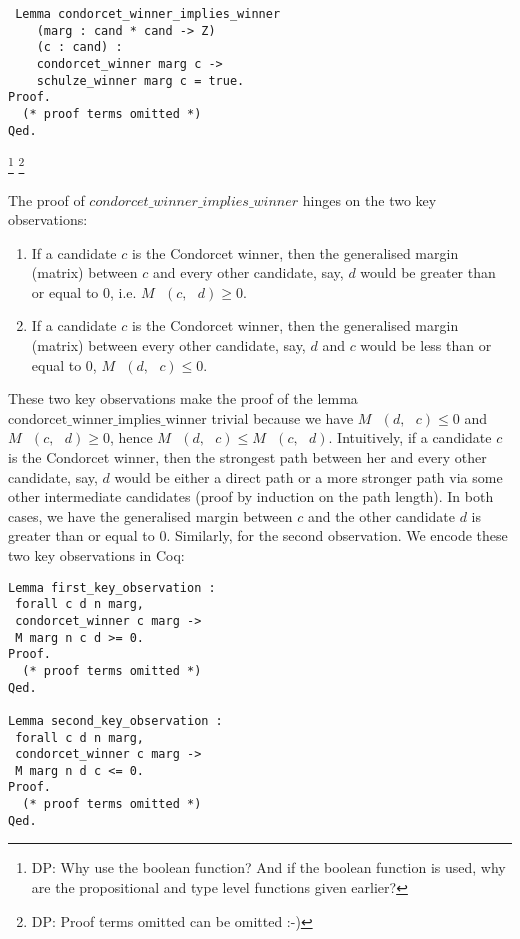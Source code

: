 \documentclass[compsoc,conference,a4paper,10pt,times]{IEEEtran}
\begin{document}
\begin{verbatim}
 Lemma condorcet_winner_implies_winner 
    (marg : cand * cand -> Z)
    (c : cand) : 
    condorcet_winner marg c -> 
    schulze_winner marg c = true. 
Proof.
  (* proof terms omitted *)
Qed.
\end{verbatim}
\footnote{DP: Why use the boolean function? And if the boolean
function is used, why are the propositional and type level functions
given earlier?}
\footnote{DP: Proof terms omitted can be omitted :-)}

  		
 The proof of $condorcet\_winner\_implies\_winner$ hinges on the two key observations:
 
 \begin{enumerate}
  \item If a candidate $c$ is the Condorcet winner, then the generalised margin (matrix) 
  between $c$
  and every other candidate, say, $d$ would be greater than or equal to 0, i.e. 
  $M \text{ } (c, \text{ }d) \geq 0$.
  
  \item If a candidate $c$ is the Condorcet winner, then the generalised margin  (matrix)
  between every other candidate, say, $d$ and $c$ would be less than or equal to 0, 
  $M \text{ } (d, \text{ }c) \leq 0$.
 \end{enumerate}
 
 
 These two key observations make the proof of the lemma
 $\mathrm{condorcet\_winner\_implies\_winner}$ 
 trivial because we have $M \text{ } (d, \text{ }c) \leq 0$  and
  $M \text{ } (c, \text{ }d) \geq 0$, hence $M \text{ } (d, \text{ }c)  \leq 
   M \text{ } (c, \text{ }d)$. Intuitively, 
 if a candidate $c$ is the Condorcet winner, then the strongest path between her and every other 
 candidate, say, $d$ would be either a direct path or a more stronger path 
 via some other intermediate candidates (proof by induction on the path length). 
 In both cases, we have the generalised margin between 
 $c$ and the other candidate $d$ is greater than or equal to 0. 
 Similarly, for the second observation. We encode these two key observations in 
 Coq:
 
 \begin{verbatim}
Lemma first_key_observation : 
 forall c d n marg, 
 condorcet_winner c marg -> 
 M marg n c d >= 0.
Proof.
  (* proof terms omitted *)
Qed.

Lemma second_key_observation : 
 forall c d n marg, 
 condorcet_winner c marg -> 
 M marg n d c <= 0.
Proof.
  (* proof terms omitted *)
Qed. 
 \end{verbatim}
\end{document}
